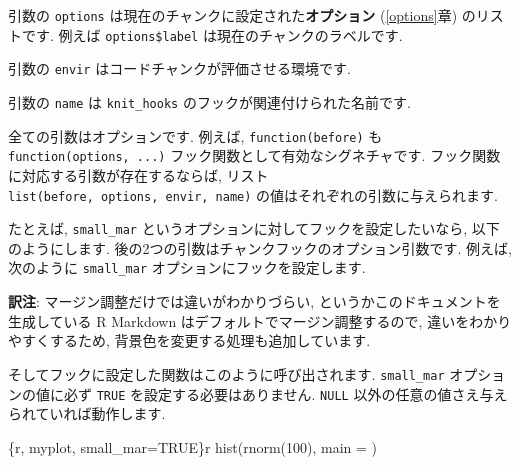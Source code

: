 \documentclass[
  lualatex,ja=standard,jafont=noto-otf]{bxjsreport}
\newenvironment{Shaded}{\begin{snugshade}}{\end{snugshade}}
\newcommand{\AttributeTok}[1]{\textcolor[rgb]{0.13,0.29,0.53}{#1}}
\newcommand{\CommentTok}[1]{\textcolor[rgb]{0.56,0.35,0.01}{\textit{#1}}}
\newcommand{\ControlFlowTok}[1]{\textcolor[rgb]{0.13,0.29,0.53}{\textbf{#1}}}
\newcommand{\DecValTok}[1]{\textcolor[rgb]{0.00,0.00,0.81}{#1}}
\newcommand{\FunctionTok}[1]{\textcolor[rgb]{0.13,0.29,0.53}{\textbf{#1}}}
\newcommand{\NormalTok}[1]{#1}
\newcommand{\SpecialCharTok}[1]{\textcolor[rgb]{0.81,0.36,0.00}{\textbf{#1}}}
\newcommand{\StringTok}[1]{\textcolor[rgb]{0.31,0.60,0.02}{#1}}
\begin{document}
引数の \texttt{options} は現在のチャンクに設定された\textbf{オプション}
(\ref{options}章) のリストです. 例えば \texttt{options\$label}
は現在のチャンクのラベルです.

引数の \texttt{envir} はコードチャンクが評価させる環境です.

引数の \texttt{name} は \texttt{knit\_hooks}
のフックが関連付けられた名前です.

全ての引数はオプションです. 例えば, \texttt{function(before)} も
\texttt{function(options,\ ...)} フック関数として有効なシグネチャです.
フック関数に対応する引数が存在するならば, リスト
\texttt{list(before,\ options,\ envir,\ name)}
の値はそれぞれの引数に与えられます.

たとえば, \texttt{small\_mar}
というオプションに対してフックを設定したいなら, 以下のようにします.
後の2つの引数はチャンクフックのオプション引数です. 例えば, 次のように
\texttt{small\_mar} オプションにフックを設定します.

\textbf{訳注}: マージン調整だけでは違いがわかりづらい,
というかこのドキュメントを生成している R Markdown
はデフォルトでマージン調整するので, 違いをわかりやすくするため,
背景色を変更する処理も追加しています.

\begin{Shaded}
\end{Shaded}

そしてフックに設定した関数はこのように呼び出されます.
\texttt{small\_mar} オプションの値に必ず \texttt{TRUE}
を設定する必要はありません. \texttt{NULL}
以外の任意の値さえ与えられていれば動作します.

\begin{Shaded}
\begin{Highlighting}[numbers=left,,]
\NormalTok{\textasciigrave{}\textasciigrave{}\textasciigrave{}\{r, myplot, small\_mar=TRUE\}\textasciigrave{}r \textquotesingle{}\textquotesingle{}\textasciigrave{}}
\NormalTok{hist(rnorm(100), main = \textquotesingle{}\textquotesingle{})}
\NormalTok{\textasciigrave{}\textasciigrave{}\textasciigrave{}}
\end{Highlighting}
\end{Shaded}
\end{document}
